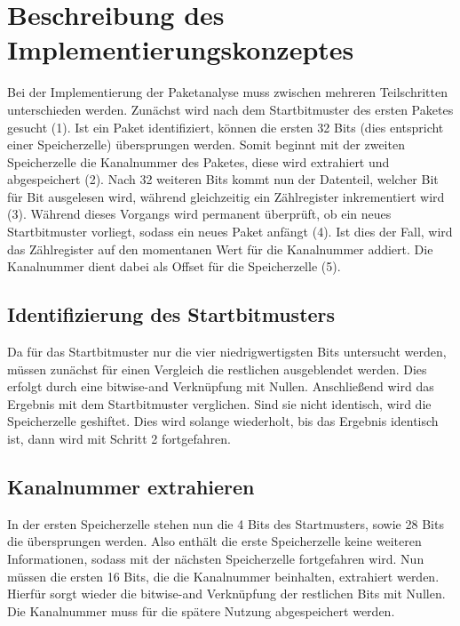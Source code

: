 \documentclass[12pt,titlepage,german,a4]{article}
\begin{document}
    \newpage

    \section{Beschreibung des Implementierungskonzeptes}
    Bei der Implementierung der Paketanalyse muss zwischen mehreren Teilschritten unterschieden werden. Zun{\"a}chst wird nach dem Startbitmuster des ersten Paketes gesucht (1). Ist ein Paket identifiziert, k{\"o}nnen die ersten 32 Bits (dies entspricht einer Speicherzelle) {\"u}bersprungen werden. Somit beginnt mit der zweiten Speicherzelle die Kanalnummer des Paketes, diese wird extrahiert und abgespeichert (2). Nach 32 weiteren Bits kommt nun der Datenteil, welcher Bit f{\"u}r Bit ausgelesen wird, w{\"a}hrend gleichzeitig ein Z{\"a}hlregister inkrementiert wird (3). W{\"a}hrend dieses Vorgangs wird permanent {\"u}berpr{\"u}ft, ob ein neues Startbitmuster vorliegt, sodass ein neues Paket anf{\"a}ngt (4). Ist dies der Fall, wird das Z{\"a}hlregister auf den momentanen Wert f{\"u}r die Kanalnummer addiert. Die Kanalnummer dient dabei als Offset f{\"u}r die Speicherzelle (5).

    \subsection{Identifizierung des Startbitmusters}
    Da f{\"u}r das Startbitmuster nur die vier niedrigwertigsten Bits untersucht werden, m{\"u}ssen zun{\"a}chst f{\"u}r einen Vergleich die restlichen ausgeblendet werden. Dies erfolgt durch eine bitwise-and Verkn{\"u}pfung mit Nullen. Anschlie{\ss}end wird das Ergebnis mit dem Startbitmuster verglichen. Sind sie nicht identisch, wird die Speicherzelle geshiftet. Dies wird solange wiederholt, bis das Ergebnis identisch ist, dann wird mit Schritt 2 fortgefahren.

    \subsection{Kanalnummer extrahieren}
    In der ersten Speicherzelle stehen nun die 4 Bits des Startmusters, sowie 28 Bits die {\"u}bersprungen werden. Also enth{\"a}lt die erste Speicherzelle keine weiteren Informationen, sodass mit der n{\"a}chsten Speicherzelle fortgefahren wird. Nun m{\"u}ssen die ersten 16 Bits, die die Kanalnummer beinhalten, extrahiert werden. Hierf{\"u}r sorgt wieder die bitwise-and Verkn{\"u}pfung der restlichen Bits mit Nullen. Die Kanalnummer muss f{\"u}r die sp{\"a}tere Nutzung abgespeichert werden.
\end{document}
